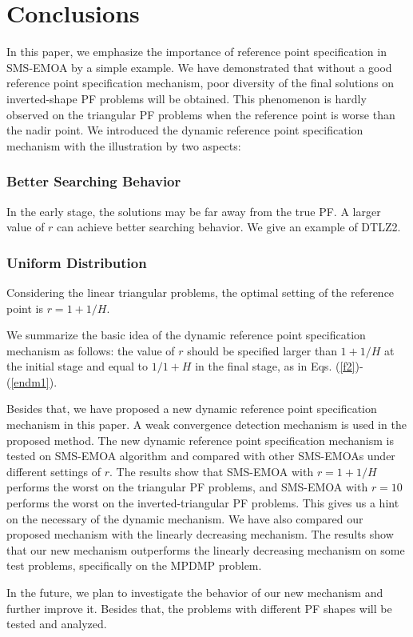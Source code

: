\documentclass[conference]{IEEEtran}
\begin{document}
\section{Conclusions}

In this paper, we emphasize the importance of reference point specification 
in SMS-EMOA by a simple example. 
We have demonstrated that without a good reference point specification mechanism, 
poor diversity of the final solutions on inverted-shape PF problems will be obtained. 
This phenomenon is hardly observed on the triangular PF problems when the reference point is worse than the nadir point. 
We introduced the dynamic reference point specification mechanism with the illustration by two aspects: 
\subsubsection{Better Searching Behavior} In the early stage, 
the solutions may be far away from the true PF. 
A larger value of $r$ can achieve better searching behavior.  
We give an example of DTLZ2. 
\subsubsection{Uniform Distribution} Considering the linear triangular problems, 
the optimal setting of the reference point is $r=1+1/H$. 

We summarize the basic idea of the dynamic reference point specification mechanism as follows: 
the value of $r$ should be specified larger than $1+1/H$ at the initial stage 
and equal to $1/1+H$ in the final stage, as in Eqs. (\ref{f2})-(\ref{endm1}). 

Besides that, we have proposed a new dynamic reference point specification mechanism in this paper. 
A weak convergence detection mechanism is used in the proposed method. 
The new dynamic reference point specification mechanism is tested on SMS-EMOA algorithm 
and compared with other SMS-EMOAs under different settings of $r$. 
The results show that SMS-EMOA with $r=1+1/H$ performs the worst on the triangular PF problems, 
and SMS-EMOA with $r=10$ performs the worst on the inverted-triangular PF problems. 
This gives us a hint on the necessary of the dynamic mechanism. 
We have also compared our proposed mechanism with the linearly decreasing mechanism. 
The results show that our new mechanism outperforms the linearly decreasing mechanism on some test problems, 
specifically on the MPDMP problem. 

In the future, we plan to investigate the behavior of our new mechanism and further improve it. 
Besides that, the problems with different PF shapes will be tested and analyzed. 

 
 
\end{document}
